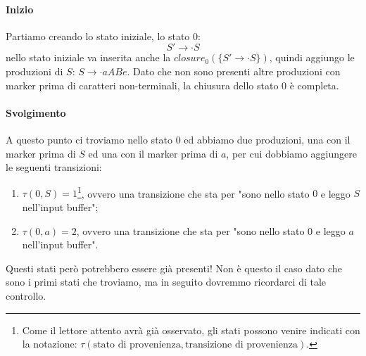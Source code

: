 \documentclass[class=book, crop=false, oneside, 12pt]{standalone}
\begin{document}
\paragraph{Inizio}
Partiamo creando lo stato iniziale, lo stato \(0\):
\begin{equation*}
    S' \to \cdot S
\end{equation*}
nello stato iniziale va inserita anche la \(closure_0(\{ S' \to \cdot S \})\), quindi aggiungo le produzioni di \(S\): \(S \to \cdot aABe\). Dato che non sono presenti altre produzioni con marker prima di caratteri non-terminali, la chiusura dello stato \(0\) è completa.

\paragraph{Svolgimento}
A questo punto ci troviamo nello stato \(0\) ed abbiamo due produzioni, una con il marker prima di \(S\) ed una con il marker prima di \(a\), per cui dobbiamo aggiungere le seguenti transizioni:
\begin{enumerate}
    \item \(\tau (0, S) = 1\)\footnote{Come il lettore attento avrà già osservato, gli stati possono venire indicati con la notazione: \(\tau( \textrm{stato di provenienza}, \textrm{transizione di provenienza})\).}, ovvero una transizione che sta per "sono nello stato \(0\) e leggo \(S\) nell'input buffer";
    \item \(\tau (0, a) = 2\), ovvero una transizione che sta per "sono nello stato \(0\) e leggo \(a\) nell'input buffer".
\end{enumerate}
Questi stati però potrebbero essere già presenti! Non è questo il caso dato che sono i primi stati che troviamo, ma in seguito dovremmo ricordarci di tale controllo. \\
\end{document}
